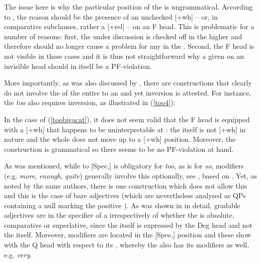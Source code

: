 The issue here is why the particular position of the  is ungrammatical. According to \citet{kennedymerchant2000}, the reason should be the presence of an unchecked [+wh] -- or, in comparative subclauses, rather a [+rel] --  on an F head. This is problematic for a number of reasons: first, the  under discussion is checked off in the higher  and therefore should no longer cause a problem for any  in the . Second, the F head is not visible in these cases and it is thus not straightforward why a given  on an invisible head should in itself be a PF-violation.

More importantly, as was also discussed by \citet{kennedymerchant2000}, there are constructions that clearly do not involve the  of the entire  to an  and yet inversion is attested. For instance, the  \textit{too} also requires inversion, as illustrated in (\ref{too4}):

\largerpage[1]
\ea \label{too4}
 \label{toobigacat}
\z
\z

In the case of (\ref{toobigacat}), it does not seem valid that the F head is equipped with a [+wh]  that happens to be uninterpretable at : the  itself is not [+wh] in nature and the whole  does not move up to a [+wh] position. Moreover, the construction is grammatical so there seems to be no PF-violation at hand.

As was mentioned, while  to [Spec,] is obligatory for \textit{too}, as is for \textit{so},   modifiers (e.g. \textit{more}, \textit{enough}, \textit{quite}) generally involve this  optionally, see \citet[129--130]{kennedymerchant2000}, based on \citet[287--288]{bresnan1973}. Yet, as noted by the same authors, there is one construction which does not allow this  and this is the case of bare adjectives (which are nevertheless analysed as QPs containing a null  marking the positive ). As was shown in  in detail, gradable adjectives are in the specifier of a  irrespectively of whether the  is absolute, comparative or superlative, since the  itself is expressed by the Deg head and not the  itself. Moreover, modifiers are located in the [Spec,] position and these show  with the Q head with respect to its , whereby the  also has its modifiers as well, e.g. \textit{very}. 

